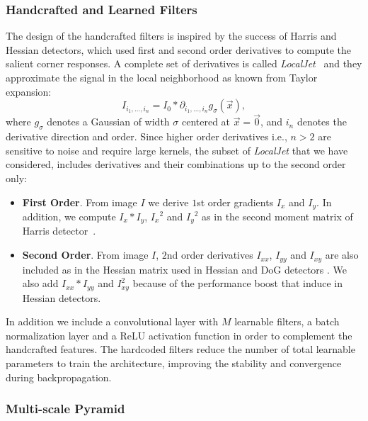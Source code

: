 \subsubsection{Handcrafted and Learned Filters}
\label{sec:handcrafted_filters}
The design of the handcrafted filters is inspired by the success of Harris \cite{Harris} and Hessian \cite{Hessian} detectors, which used first and second order derivatives to compute the salient corner responses. A complete set of derivatives is called {\em LocalJet}~\cite{Koendering-FlorackLocalJet} and they approximate the signal in the local neighborhood as known from Taylor expansion:
\begin{equation}
I_{i_1,\ldots,i_n}=I_0\ast\partial_{i_1,\ldots,i_n}g_{\sigma}(\vec{x}),
\label{eq:Taylor}
\end{equation}
where $g_{\sigma}$ denotes a Gaussian of width $\sigma$ centered at $\vec{x}=\vec{0}$, and $i_n$ denotes the derivative direction and order. Since higher order derivatives i.e., $n>2$ are sensitive to noise and require large kernels, the subset of \textit{LocalJet} that we have considered, includes derivatives and their combinations up to the second order only: 

\begin{itemize}
	\item \textbf{First Order}. From image $I$ we derive $1$st order gradients $I_x$ and $I_y$. In addition, we compute $I_x*I_y$, ${I_x}^2$ and ${I_y}^2$ as in the second moment matrix of Harris detector~\cite{Harris}.
    \item \textbf{Second Order}. From image $I$, $2$nd order derivatives $I_{xx}$, $I_{yy}$ and $I_{xy}$ are also included as in the Hessian matrix used in Hessian and DoG detectors \cite{HarrisLaplace,SIFT}.  We also add $I_{xx}*I_{yy}$ and $I_{xy}^2$ because of the performance boost that induce in Hessian detectors.
\end{itemize}

In addition we include a convolutional layer with $M$ learnable filters, a batch normalization layer and a ReLU activation function in order to complement the handcrafted features.
The hardcoded filters reduce the number of total learnable parameters to train the architecture, improving the stability and convergence during backpropagation.

\subsubsection{Multi-scale Pyramid }
\label{sec:pyramid}

